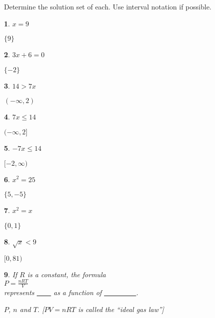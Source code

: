 \documentclass{amsbook}
\newtheorem{exc}{}
\newenvironment{ex}{\begin{exc}\normalfont}{\end{exc}}
\numberwithin{section}{chapter}
\numberwithin{equation}{chapter}
\newcommand{\ds}{\displaystyle}
\begin{document}
Determine the solution set of each. Use interval notation if possible.

\begin{multicols}{2}
	\begin{ex}
		$x=9$
		\begin{sol}
			$\{9\}$
		\end{sol}
	\end{ex}
	\begin{ex}
	$3x+6=0$
	\begin{sol}
		$\{-2\}$
	\end{sol}
\end{ex}
\begin{ex}
	$14>7x$
	\begin{sol}
		$(-\infty, 2)$
	\end{sol}
\end{ex}

	\begin{ex}
	$7x \leq 14$
	\begin{sol}
		$(-\infty, 2]$
	\end{sol}
\end{ex}

\begin{ex}
	$-7x \leq 14$
	\begin{sol}
		$[-2,\infty)$
	\end{sol}
\end{ex}


\begin{ex}
	$x^2=25$
	\begin{sol}
		$\{5, -5\}$
	\end{sol}
\end{ex}


\begin{ex}
	$x^2=x$
	\begin{sol}
		$\{0, 1\}$
	\end{sol}
\end{ex}

\begin{ex}
	$\sqrt{x} < 9$
	\begin{sol}
		$[0,81)$
	\end{sol}
\end{ex}

\begin{ex}
	If $R$ is a constant, the formula \\$\ds{P = \frac{nRT}{V}}$\\ represents \underline{\ \ \ \ } as a function of \underline{\ \ \ \ \ \ \ \ \ }.
	\begin{sol}
		$P$, $n$ and $T$. [$PV=nRT$ is called the ``ideal gas law'']
	\end{sol}
\end{ex}


\end{multicols}
\end{document}
